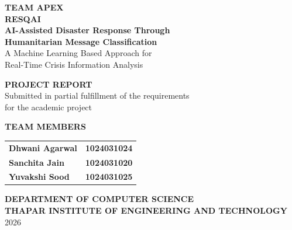 \documentclass[12pt,a4paper]{article}
\begin{document}
\begin{titlepage}
    \centering

    \vspace*{0.8cm}

    {\Large \textbf{TEAM APEX}}\\[0.8cm]

    {\LARGE \textbf{RESQAI}}\\[0.5cm]

    {\Large \textbf{AI-Assisted Disaster Response Through\\
    Humanitarian Message Classification}}\\[1.2cm]

    {\large A Machine Learning Based Approach for\\
    Real-Time Crisis Information Analysis}\\[1.5cm]

    \vfill

    {\large \textbf{PROJECT REPORT}}\\[0.8cm]

    Submitted in partial fulfillment of the requirements\\
    for the academic project

    \vspace{1.2cm}

    {\large \textbf{TEAM MEMBERS}}\\[0.6cm]

    \begin{tabular}{ll}
        \textbf{Dhwani Agarwal} & \textbf{1024031024} \\
        \textbf{Sanchita Jain} & \textbf{1024031020} \\
        \textbf{Yuvakshi Sood} & \textbf{1024031025}
    \end{tabular}

    \vspace{1.5cm}

    {\large \textbf{DEPARTMENT OF COMPUTER SCIENCE}}\\[0.4cm]

    {\large \textbf{THAPAR INSTITUTE OF ENGINEERING AND TECHNOLOGY}}\\[0.8cm]

    {\large 2026}

\end{titlepage}
\end{document}
